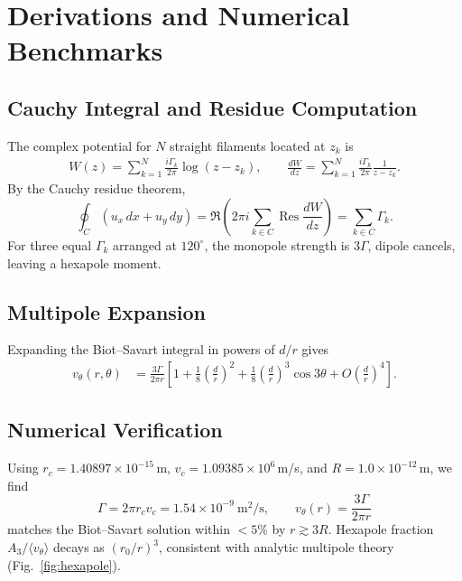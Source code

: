 \documentclass[10pt,reprint,aps,onecolumn,nofootinbib]{revtex4-2}
\begin{document}
    \section{Derivations and Numerical Benchmarks}
    \label{app:three-swirl-derivations}

    \subsection{Cauchy Integral and Residue Computation}
        The complex potential for $N$ straight filaments located at $z_k$ is
        \begin{align}
        W(z)=\sum_{k=1}^{N}\frac{i\Gamma_k}{2\pi}\log(z-z_k),
        \qquad
        \frac{dW}{dz}=\sum_{k=1}^{N}\frac{i\Gamma_k}{2\pi}\frac{1}{z-z_k}.
        \end{align}
        By the Cauchy residue theorem,
        \[
            \oint_{C} (u_x\,dx+u_y\,dy)
            =\Re\!\left(2\pi i\sum_{k\in C}\operatorname{Res}\frac{dW}{dz}\right)
            =\sum_{k\in C}\Gamma_k.
        \]
        For three equal $\Gamma_k$ arranged at $120^\circ$, the monopole strength is $3\Gamma$,
        dipole cancels, leaving a hexapole moment.

    \subsection{Multipole Expansion}
        Expanding the Biot--Savart integral in powers of $d/r$ gives
        \begin{align}
        v_\theta(r,\theta)
        &=\frac{3\Gamma}{2\pi r}\left[1+\frac{1}{8}\!\left(\frac{d}{r}\right)^2
        +\frac{1}{8}\!\left(\frac{d}{r}\right)^3\cos3\theta+O\!\left(\frac{d}{r}\right)^4\right].
        \end{align}

    \subsection{Numerical Verification}
        Using $r_c=1.40897\times10^{-15}\,$m, $v_c=1.09385\times10^{6}\,$m/s, and
        $R=1.0\times10^{-12}\,$m, we find
        \[
            \Gamma=2\pi r_c v_c=1.54\times 10^{-9}\ \mathrm{m^2/s},\qquad
            v_\theta(r)=\frac{3\Gamma}{2\pi r}
        \]
        matches the Biot--Savart solution within $<5\%$ by $r\gtrsim 3R$. Hexapole fraction
        $A_3/\langle v_\theta\rangle$ decays as $(r_0/r)^3$, consistent with analytic
        multipole theory (Fig.~\ref{fig:hexapole}).
\end{document}
